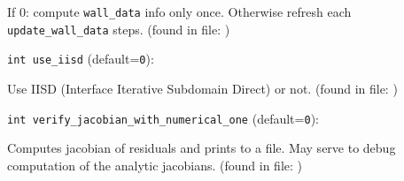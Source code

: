 If 0: compute \verb+wall_data+ info only once. Otherwise
  refresh each \verb+update_wall_data+ steps. 
 (found in file: \verb++)
\item\verb+int use_iisd+ {\rm(default=\verb|0|)}:

Use IISD (Interface Iterative Subdomain Direct) or not.
 (found in file: \verb++)
\item\verb+int verify_jacobian_with_numerical_one+ {\rm(default=\verb|0|)}:

Computes jacobian of residuals and prints to a file.
 May serve to debug computation of the analytic jacobians. 
 (found in file: \verb++)
